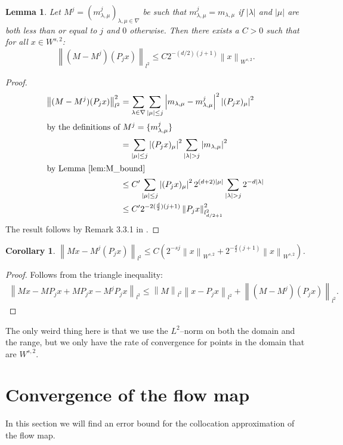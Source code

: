 \documentclass[12pt]{amsart}
\newtheorem{corollary}{Corollary}
\newtheorem{lemma}{Lemma}
\newcommand{\card}[1]{{\lvert#1\rvert}}
\newcommand{\abs}[1]{\ensuremath{\left\lvert #1\right\rvert}}
\newcommand{\norm}[1]{\ensuremath{\left\lVert #1\right\rVert}}
\begin{document}
\begin{lemma} 
	Let $M^j=(m^j_{\lambda,\mu})_{\lambda,\mu \in \nabla}$ be such that $m^j_{\lambda,\mu} = m_{\lambda,\mu}$ if $\card{\lambda}$ and $\card{\mu}$ are both less than or equal to $j$ and $0$ otherwise. Then there exists a $C > 0$ such that for all $x \in W^{s,2}$:
	\begin{equation}
		\norm{(M-M^j)(P_jx)}_{l^2} \leq C2^{-(d/2)(j+1)} \norm{x}_{W^{s,2}}.
	\end{equation}
\end{lemma}
\begin{proof}
	\begin{align}
		\norm{(M-M^j)(P_j x)}_{l^2}^2 &= \sum_{\lambda \in \nabla} \sum_{\card{\mu}\leq j} \abs{m_{\lambda,\mu}-m^j_{\lambda,\mu}}^2 \abs{(P_j x)_\mu}^2 \\
	\intertext{by the definitions of $M^j = \{ m_{\lambda,\mu}^j \}$ }
		&= \sum_{\card{\mu}\leq j}\abs{(P_j x)_\mu}^2 \sum_{\card{\lambda}>j}\abs{m_{\lambda,\mu}}^2 \\
	\intertext{by Lemma \ref{lem:M_bound}}
		&\leq C'\sum_{\card{\mu}\leq j}\abs{(P_j x)_\mu}^2 2^{(d+2)\card{\mu}}\sum_{\card{\lambda}>j}2^{-d\card{\lambda}} \\
		&\leq C' 2^{-2(\frac{d}{2})(j+1)}\norm{P_j x}^2_{l^2_{d/2+1}}
	\end{align}
	The result follows by Remark 3.3.1 in \cite{Cohen2003}.
\end{proof}

\begin{corollary}
	$\norm{Mx - M^j(P_j x)}_{l^2} \leq C \left( 2^{-sj}\norm{x}_{W^{s,2}} + 2^{-\frac{d}{2}(j+1)}\norm{x}_{W^{s,2}} \right)$.
\end{corollary}
\begin{proof}
	Follows from the triangle inequality:
	\begin{multline}
		\norm{Mx - M P_j x + M P_j x - M^j P_j x}_{l^2} \leq \norm{M}_{l^2} \norm{x - P_j x}_{l^2} + \norm{(M-M^j)(P_jx)}_{l^2}.
	\end{multline}
\end{proof}

The only weird thing here is that we use the $L^2$--norm on both the domain and the range, but we only have the rate of convergence for points in the domain that are $W^{s,2}$.

\section{Convergence of the flow map}
In this section we will find an error bound for the collocation approximation of the flow map.
\end{document}
